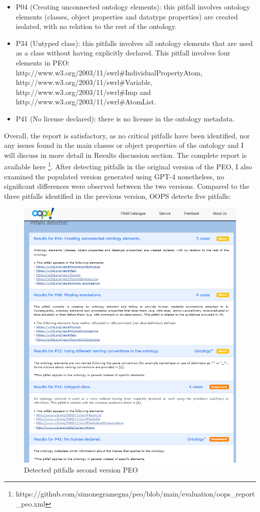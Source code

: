 \begin{itemize}
    \item P04 (Creating unconnected ontology elements): this pitfall involves ontology elements (classes, object properties and datatype properties) are created isolated, with no relation to the rest of the ontology. 

    \item P34 (Untyped class): this pitfalls involves all ontology elements that are used as a class without having explicitly declared. This pitfall involves four elements in PEO: \\ http://www.w3.org/2003/11/swrl\#IndividualPropertyAtom,\\ http://www.w3.org/2003/11/swrl\#Variable,\\ http://www.w3.org/2003/11/swrl\#Imp and \\http://www.w3.org/2003/11/swrl\#AtomList.

    \item P41 (No license declared): there is no license in the ontology metadata.    
\end{itemize}
Overall, the report is satisfactory, as no critical pitfalls have been identified, nor any issues found in the main classes or object properties of the ontology and I will discuss in more detail in Results discussion section.
The complete report is available here \footnote{https://github.com/simonegramegna/peo/blob/main/evaluation/oops\_report\_peo.xml}. After detecting pitfalls in the original version of the PEO, I also examined the populated version generated using GPT-4 nonetheless, no significant differences were observed between the two versions. Compared to the three pitfalls identified in the previous version, OOPS detects five pitfalls:
\begin{figure}[H]
    \centering
    \includegraphics[width=0.75\linewidth]{Figures/fig_44.png}
    \caption{Detected pitfalls second version PEO}
    \label{fig:enter-label}
\end{figure}


